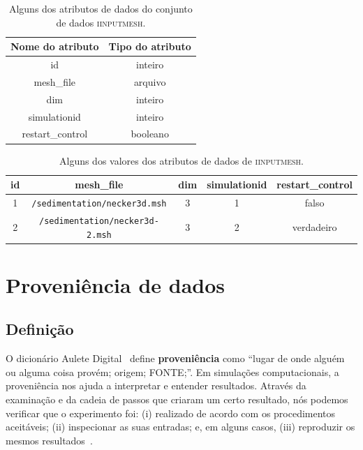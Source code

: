 \begin{table}[ht]
    \centering
    \begin{tabular}{|c|c|}
        \hline
        \textbf{Nome do atributo} & \textbf{Tipo do atributo} \\
        \hline
        id & inteiro \\
        mesh{\_}file & arquivo \\
        dim & inteiro \\
        simulationid & inteiro \\
        restart{\_}control & booleano \\
        \hline
    \end{tabular}
    \caption[Atributos de dados do conjunto de dados \textsc{iinputmesh}]{Alguns dos atributos de dados do conjunto de dados \textsc{iinputmesh}.}%
    \label{tab:iinputmesh-attributes}
\end{table}

\begin{table}[ht]
    \centering
    \begin{tabular}{c|c|c|c|c}
        \textbf{id} & \textbf{mesh{\_}file} & \textbf{dim} & \textbf{simulationid} & \textbf{restart{\_}control} \\
        \hline
        1 & \texttt{/sedimentation/necker3d.msh} & 3 & 1 & \textrm{falso} \\
        2 & \texttt{/sedimentation/necker3d-2.msh} & 3 & 2 & \textrm{verdadeiro} \\
    \end{tabular}
    \caption[Valores dos atributos de dados de \textsc{iinputmesh}]{Alguns dos valores dos atributos de dados de \textsc{iinputmesh}.}%
    \label{tab:iinputmesh-values}
\end{table}

\section{Proveniência de dados}

\subsection{Definição}

O dicionário Aulete Digital~\cite{auletedigitalonline} define \textbf{proveniência} como
``lugar de onde alguém ou alguma coisa provém; origem; FONTE;''. Em simulações computacionais, a proveniência nos ajuda a interpretar e entender resultados. Através da examinação e da cadeia de passos que criaram um certo resultado, nós podemos verificar que o experimento foi: (i) realizado de acordo com os procedimentos aceitáveis; (ii) inspecionar as suas entradas; e, em alguns casos, (iii) reproduzir os mesmos resultados~\cite{freire2008provenance}.


